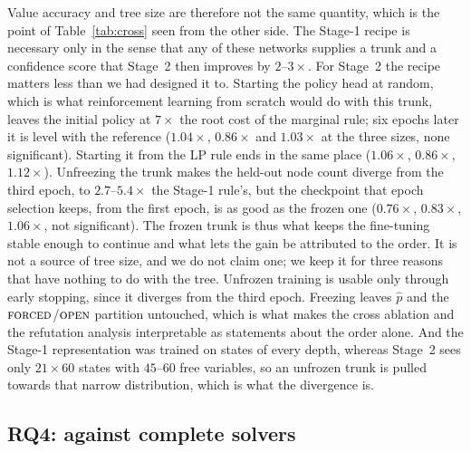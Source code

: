 \documentclass[final,5p,times,twocolumn,authoryear]{elsarticle}
\newcommand{\FORCED}{\textsc{forced}}
\newcommand{\FREE}{\textsc{open}}
\begin{document}
Value accuracy and tree size are therefore not the same quantity, which is the point of Table~\ref{tab:cross} seen from the other side. The Stage-1 recipe is necessary only in the sense that any of these networks supplies a trunk and a confidence score that Stage~2 then improves by $2$--$3\times$.
For Stage~2 the recipe matters less than we had designed it to. Starting the policy head at random, which is what reinforcement learning from scratch would do with this trunk, leaves the initial policy at $7\times$ the root cost of the marginal rule; six epochs later it is level with the reference ($1.04\times$, $0.86\times$ and $1.03\times$ at the three sizes, none significant). Starting it from the LP rule ends in the same place ($1.06\times$, $0.86\times$, $1.12\times$). Unfreezing the trunk makes the held-out node count diverge from the third epoch, to $2.7$--$5.4\times$ the Stage-1 rule's, but the checkpoint that epoch selection keeps, from the first epoch, is as good as the frozen one ($0.76\times$, $0.83\times$, $1.06\times$, not significant). The frozen trunk is thus what keeps the fine-tuning stable enough to continue and what lets the gain be attributed to the order. It is not a source of tree size, and we do not claim one; we keep it for three reasons that have nothing to do with the tree. Unfrozen training is usable only through early stopping, since it diverges from the third epoch. Freezing leaves $\hat p$ and the $\FORCED$/$\FREE$ partition untouched, which is what makes the cross ablation and the refutation analysis interpretable as statements about the order alone. And the Stage-1 representation was trained on states of every depth, whereas Stage~2 sees only $21\times60$ states with $45$--$60$ free variables, so an unfrozen trunk is pulled towards that narrow distribution, which is what the divergence is.

\subsection{RQ4: against complete solvers}
\label{sec:rq4}


\end{document}
